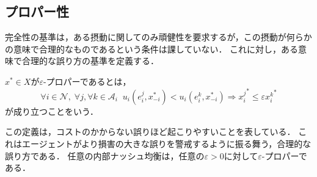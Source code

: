 \documentclass{jsreport}
\begin{document}
\subsection{プロパー性}
完全性の基準は，ある摂動に関してのみ頑健性を要求するが，この摂動が何らかの意味で合理的なものであるという条件は課していない．
これに対し，ある意味で合理的な誤り方の基準を定義する．
\begin{screen}
  \begin{defi}
    $x^{*} \in X$が$\varepsilon$-プロパーであるとは，
    \begin{equation}
      \forall i \in \mathcal{N}, \; \forall j, \forall k \in \mathcal{A}_i \; \; u_i(e_i^j, x_{-i}^{*}) < u_i(e_i^k, x_{-i}^{*}) \Rightarrow {x_i^{j}}^{*} \leq \varepsilon {x_i^k}^{*} \nonumber
    \end{equation}
    が成り立つことをいう．
  \end{defi}
\end{screen}

この定義は，コストのかからない誤りほど起こりやすいことを表している．
これはエージェントがより損害の大きな誤りを警戒するように振る舞う，合理的な誤り方である．
任意の内部ナッシュ均衡は，任意の$\varepsilon > 0$に対して$\varepsilon$-プロパーである．
\end{document}
